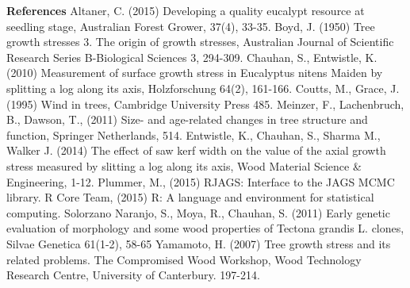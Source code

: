 \textbf{References}
Altaner, C. (2015) Developing a quality eucalypt resource at seedling stage, Australian Forest Grower, 37(4), 33-35. 
Boyd, J. (1950) Tree growth stresses 3. The origin of growth stresses, Australian Journal of Scientific Research Series B-Biological Sciences 3, 294-309.
Chauhan, S., Entwistle, K. (2010) Measurement of surface growth stress in Eucalyptus nitens Maiden by splitting a log along its axis, Holzforschung 64(2), 161-166.
Coutts, M., Grace, J. (1995) Wind in trees, Cambridge University Press 485. 
Meinzer, F., Lachenbruch, B., Dawson, T., (2011) Size- and age-related changes in tree structure and function, Springer Netherlands, 514.
Entwistle, K., Chauhan, S., Sharma M., Walker J. (2014) The effect of saw kerf width on the value of the axial growth stress measured by slitting a log along its axis, Wood Material Science & Engineering, 1-12.
Plummer, M., (2015) RJAGS: Interface to the JAGS MCMC library. 
R Core Team, (2015) R: A language and environment for statistical computing.
Solorzano Naranjo, S., Moya, R., Chauhan, S. (2011) Early genetic evaluation of morphology and some wood properties of Tectona grandis L. clones, Silvae Genetica 61(1-2), 58-65
Yamamoto, H. (2007) Tree growth stress and its related problems. The Compromised Wood Workshop, Wood Technology Research Centre, University of Canterbury. 197-214.
